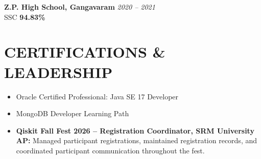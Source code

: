 \documentclass[a4paper,10pt]{article}
\begin{document}
\textbf{Z.P. High School, Gangavaram}
\hfill
\textit{2020 -- 2021}\\
SSC
\hfill
\textbf{94.83\%}

\section*{CERTIFICATIONS \& LEADERSHIP}

\begin{itemize}
    \item Oracle Certified Professional: Java SE 17 Developer
    \item MongoDB Developer Learning Path
    \item \textbf{Qiskit Fall Fest 2026 -- Registration Coordinator,
    SRM University AP:} Managed participant registrations,
    maintained registration records, and coordinated
    participant communication throughout the fest.
\end{itemize}
\end{document}
